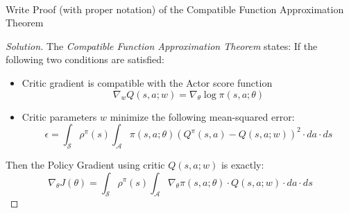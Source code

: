 \documentclass[12pt]{article}
\newenvironment{problem}[2][Problem]{\begin{trivlist}
\item[\hskip \labelsep {\bfseries #1}\hskip \labelsep {\bfseries #2.}]}{\end{trivlist}}
\newenvironment{solution}
  {\renewcommand\qedsymbol{$\blacksquare$}\begin{proof}[Solution]}
  {\end{proof}}
\begin{document}
\begin{problem}{5}
	\text{ }\\
	Write Proof (with proper notation) of the Compatible Function Approximation Theorem
\end{problem}
\begin{solution}
	The \textit{Compatible Function Approximation Theorem} states:
	If the following two conditions are satisfied:
	\begin{itemize}[noitemsep]
		\item Critic gradient is compatible with the Actor score function
		\begin{equation}
		\nabla_{w} Q(s, a ; w)=\nabla_{\theta} \log \pi(s, a ; \theta)
		\end{equation}
		\item Critic parameters $w$ minimize the following mean-squared error:
		\begin{equation}
		\epsilon=\int_{\mathcal{S}} \rho^{\pi}(s) \int_{\mathcal{A}} \pi(s, a ; \theta)\left(Q^{\pi}(s, a)-Q(s, a ; w)\right)^{2} \cdot d a \cdot d s
		\end{equation}
	\end{itemize}
	Then the Policy Gradient using critic $Q(s, a ; w)$ is exactly:
	\begin{equation}\label{eq:theorem_eqn}
	\nabla_{\theta} J(\theta)=\int_{\mathcal{S}} \rho^{\pi}(s) \int_{\mathcal{A}} \nabla_{\theta} \pi(s, a ; \theta) \cdot Q(s, a ; w) \cdot d a \cdot d s
	\end{equation}
	

\end{solution}
\end{document}
